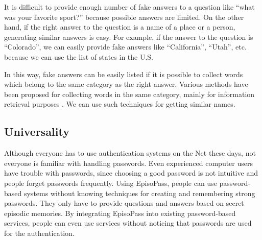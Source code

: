 \documentclass{article}
\begin{document}
It is difficult to provide enough number of fake answers to a question like
``what was your favorite sport?''
because possible answers are limited.
%
%
%
On the other hand, if the right answer to the question is a name of a place or a person,
generating similar answers is easy.
For example, if the answer to the question is ``Colorado'',
we can easily provide fake answers like ``California'', ``Utah'', etc.
because we can use the list of states in the U.S.

In this way, fake answers can be easily listed
if it is possible to collect words which belong to the same
category as the right answer.
%
Various methods have been proposed for collecting words in the
same category, mainly for information retrieval purposes
\cite{Huang:2012:LFC:2426725.2426728}%
\cite{BooWa}%
\cite{Wang:2007:LSE:1441428.1442086}%
\cite{大島裕明:2006-12-15}.%
We can use such techniques for getting similar names.

\subsection{Universality}

Although everyone has to use authentication systems on the Net these days,
not everyone is familiar with handling passwords.
Even experienced computer users have trouble with passwords,
since choosing a good password is not intuitive and
people forget passwords frequently.
%
Using EpisoPass, people can use password-based systems without knowing
techniques for creating and remembering strong passwords.
They only have to provide
questions and answers based on secret episodic memories.
%
By integrating EpisoPass into existing password-based services,
people can even use services without noticing that passwords are
used for the authentication.
\end{document}
